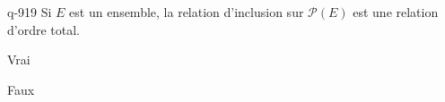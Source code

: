 \begin{truefalse}{q-919}
Si $E$ est un ensemble, la relation d'inclusion sur $\mathcal P(E)$ est une relation d'ordre total.
\item Vrai
\item* Faux
\end{truefalse}

